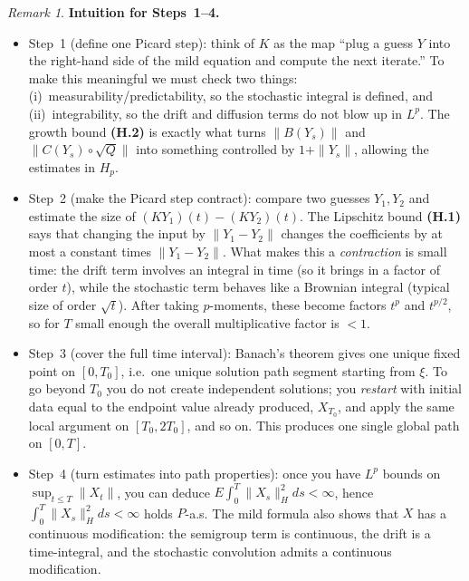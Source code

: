 \documentclass[11pt]{article}
\theoremstyle{definition}
\theoremstyle{remark}
\newtheorem{remark}{Remark}
\begin{document}
\begin{remark}
\textbf{Intuition for Steps~1--4.}
\begin{itemize}
    \item Step~1 (define one Picard step): think of $K$ as the map ``plug a guess $Y$ into
    the right-hand side of the mild equation and compute the next iterate.''  To make this meaningful
    we must check two things: (i)\ measurability/predictability, so the stochastic integral is defined,
    and (ii)\ integrability, so the drift and diffusion terms do not blow up in $L^p$.  The growth bound
    \textbf{(H.2)} is exactly what turns $\|B(Y_s)\|$ and $\|C(Y_s)\circ\sqrt Q\|$ into something controlled
    by $1+\|Y_s\|$, allowing the estimates in $H_p$.
    \item Step~2 (make the Picard step contract): compare two guesses $Y_1,Y_2$ and estimate the size of
    $(KY_1)(t)-(KY_2)(t)$.  The Lipschitz bound \textbf{(H.1)} says that changing the
    input by $\|Y_1-Y_2\|$ changes the coefficients by at most a constant times $\|Y_1-Y_2\|$.  What makes
    this a \emph{contraction} is small time: the drift term involves an integral in time (so it brings in a
    factor of order $t$), while the stochastic term behaves like a Brownian integral (typical size of order
    $\sqrt{t}$).  After taking $p$-moments, these become factors $t^{p}$ and $t^{p/2}$, so for $T$ small
    enough the overall multiplicative factor is $<1$.
    \item Step~3 (cover the full time interval): Banach's theorem gives one unique fixed point on
    $[0,T_0]$, i.e.\ one unique solution path segment starting from $\xi$.  To go beyond $T_0$ you do not
    create independent solutions; you \emph{restart} with initial data equal to the endpoint value already
    produced, $X_{T_0}$, and apply the same local argument on $[T_0,2T_0]$, and so on.  This produces one
    single global path on $[0,T]$.
    \item Step~4 (turn estimates into path properties): once you have $L^p$ bounds on $\sup_{t\le T}\|X_t\|$,
    you can deduce $E\int_0^T\|X_s\|_H^2ds<\infty$, hence $\int_0^T\|X_s\|_H^2ds<\infty$ holds $P$-a.s.  The
    mild formula also shows that $X$ has a continuous modification: the semigroup term is continuous, the drift
    is a time-integral, and the stochastic convolution admits a continuous modification.
\end{itemize}
\end{remark}
\end{document}
